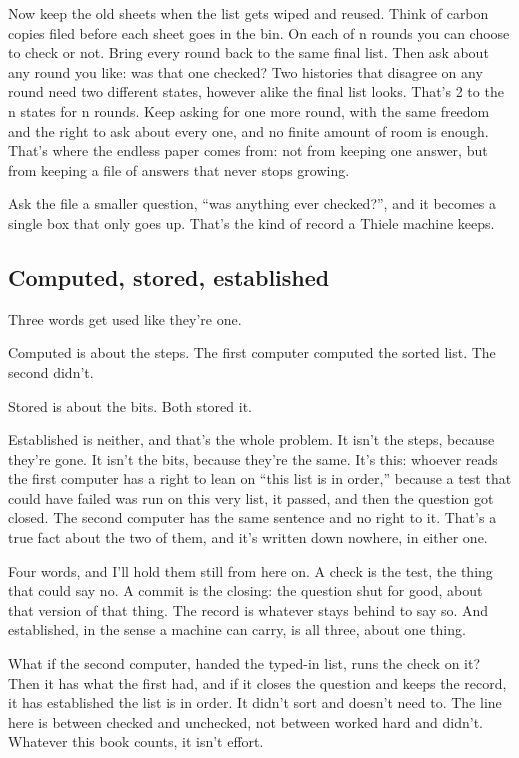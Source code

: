 \documentclass[11pt,twoside]{article}
\theoremstyle{thielethm}
\theoremstyle{thieledef}
\theoremstyle{thieledef}
\theoremstyle{thieledef}
\theoremstyle{thielethm}
\theoremstyle{thieleobs}
\theoremstyle{thielethm}
\begin{document}
Now keep the old sheets when the list gets wiped and reused. Think of carbon copies filed before each sheet goes in the bin. On each of n rounds you can choose to check or not. Bring every round back to the same final list. Then ask about any round you like: was that one checked? Two histories that disagree on any round need two different states, however alike the final list looks. That's 2 to the n states for n rounds. Keep asking for one more round, with the same freedom and the right to ask about every one, and no finite amount of room is enough. That's where the endless paper comes from: not from keeping one answer, but from keeping a file of answers that never stops growing.

Ask the file a smaller question, ``was anything ever checked?'', and it becomes a single box that only goes up. That's the kind of record a Thiele machine keeps.

\subsection{Computed, stored, established}

Three words get used like they're one.

Computed is about the steps. The first computer computed the sorted list. The second didn't.

Stored is about the bits. Both stored it.

Established is neither, and that's the whole problem. It isn't the steps, because they're gone. It isn't the bits, because they're the same. It's this: whoever reads the first computer has a right to lean on ``this list is in order,'' because a test that could have failed was run on this very list, it passed, and then the question got closed. The second computer has the same sentence and no right to it. That's a true fact about the two of them, and it's written down nowhere, in either one.

Four words, and I'll hold them still from here on. A check is the test, the thing that could say no. A commit is the closing: the question shut for good, about that version of that thing. The record is whatever stays behind to say so. And established, in the sense a machine can carry, is all three, about one thing.

What if the second computer, handed the typed-in list, runs the check on it? Then it has what the first had, and if it closes the question and keeps the record, it has established the list is in order. It didn't sort and doesn't need to. The line here is between checked and unchecked, not between worked hard and didn't. Whatever this book counts, it isn't effort.
\end{document}
